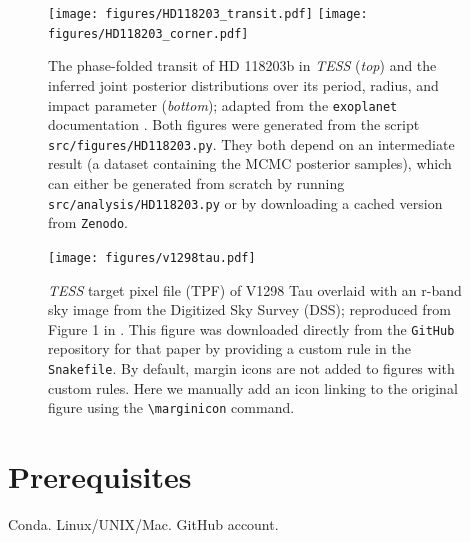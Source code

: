 \documentclass[twocolumn]{aastex631}
\begin{document}
\begin{figure}[ht!]
    \begin{centering}
        \texttt{[image: figures/HD118203\_transit.pdf]}
        \texttt{[image: figures/HD118203\_corner.pdf]}
        \caption{
            The phase-folded transit of HD 118203b in \emph{TESS} (\emph{top}) and the inferred joint posterior distributions over its period, radius, and impact parameter (\emph{bottom}); adapted from the \texttt{exoplanet} documentation \citep{ForemanMackey2021}.
            Both figures were generated from the script \texttt{src/figures/HD118203.py}. 
            They both depend on an intermediate result (a dataset containing the MCMC posterior samples), which can either be generated from scratch by running \texttt{src/analysis/HD118203.py} or by downloading a cached version from \texttt{Zenodo}.
        }
        \label{fig:HD118203}
    \end{centering}
\end{figure}

\begin{figure}[ht!]
    \begin{centering}
        \texttt{[image: figures/v1298tau.pdf]}
        \caption{
            \emph{TESS} target pixel file (TPF) of V1298 Tau
            overlaid with an r-band sky image from the Digitized Sky Survey (DSS);
            reproduced from Figure 1 in \citet{Feinstein2021}.
            This figure was downloaded directly from the \texttt{GitHub} repository for that paper by providing a custom rule in the \texttt{Snakefile}.
            By default, margin icons are not added to figures with custom rules.
            Here we manually add an icon linking to the original figure using the \texttt{\textbackslash marginicon} command.
        }
        \label{fig*:v1298tau}
    \end{centering}
\end{figure}

\section{Prerequisites}
\label{sec:prereq}
Conda. Linux/UNIX/Mac. GitHub account.
\end{document}

